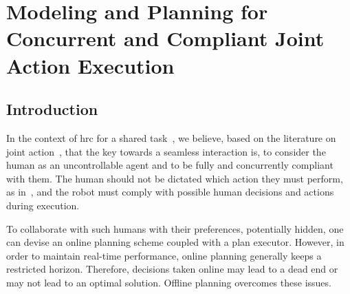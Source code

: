 \cleardoublepage

\ifdefined{}
\else
\setcounter{chapter}{3} %
\dominitoc
\faketableofcontents
\fi

\chapter{Modeling and Planning for Concurrent and Compliant Joint Action Execution}
\label{chap:4}
\minitoc


\section{Introduction}


In the context of \acrshort{hrc} for a shared task~\cite{selvaggio2021autonomy}, we believe, based on the literature on joint action~\cite{sebanz_2006joint,sebanz-2009,clodic-2017,gordon-2023}, that the key towards a seamless interaction is, to consider the human as an uncontrollable agent and to be fully and concurrently compliant with them. 
The human should not be dictated which action they must perform, as in~\cite{roncone2017transparent,buisan_hatpehda_icra}, and the robot must comply with possible human decisions and actions during execution.

To collaborate with such humans with their preferences, potentially hidden, one can devise an online planning scheme coupled with a plan executor. 
However, in order to maintain real-time performance, online planning generally keeps a restricted horizon. 
Therefore, decisions taken online may lead to a dead end or may not lead to an optimal solution. 
Offline planning overcomes these issues. 

